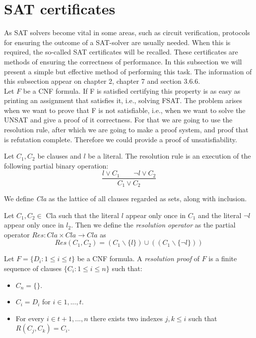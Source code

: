 \section{SAT certificates}

As SAT solvers become vital in some areas, such as circuit verification, protocols for ensuring the outcome of a SAT-solver are usually needed. When this is required, the so-called SAT certificates will be recalled. These certificates are methods of ensuring the correctness of performance. In this subsection we will present a simple but effective method of performing this task. The information of this subsection appear on chapter 2\cite{schoning2013satisfiability}, chapter 7\cite{marek2009introduction} and section 3.6.6\cite{darwiche2009complete}.\\


Let $F$ be a CNF formula. If F is satisfied certifying this property is as easy as printing an assignment that satisfies it, i.e., solving FSAT. The problem arises when we want to prove that F is not satisfiable, i.e., when we want to solve the UNSAT and give a proof of it correctness. For that we are going to use the resolution rule, after which we are going to make a proof system, and proof that is refutation complete. Therefore we could provide a proof of unsatisfiability.

\begin{definition}
  Let $C_1,C_2$ be clauses and $l$ be a literal. The resolution rule is an execution of the following partial binary operation:
  $$\frac{l \lor C_1 \qquad \neg l \lor C_2}{ C_1 \lor C_2}$$
\end{definition}

\begin{definition}
  
We define \emph{Cla} as the lattice of all clauses regarded as sets, along with inclusion. 
\end{definition}

\begin{definition}
 Let $C_1,C_2\in$ Cla  such that the literal $l$ appear only once in $C_1$ and the literal $\neg l$ appear only once in $l_2$. Then we define the \emph{resolution operator} as the partial operator $Res: Cla \times Cla \to Cla$ as
  $$Res(C_1,C_2) = (C_1 \backslash \{l\}) \cup ((C_1 \backslash \{\neg l\}))$$
\end{definition}

\begin{definition}
  Let $F = \{D_i : 1 \le i \le t\}$ be a CNF formula. A \emph{resolution proof} of $F$ is a finite sequence of clauses $\{C_i : 1\le i \le n\}$ such that:
  \begin{itemize}
  \item $C_n = \{\}$.
  \item $C_i  = D_i $ for $i\in 1,...,t$.
  \item For every $i\in t+1,...,n$ there exists two indexes $j,k\le i$ such that $R(C_j,C_k)  = C_i$.
  \end{itemize}
\end{definition}

